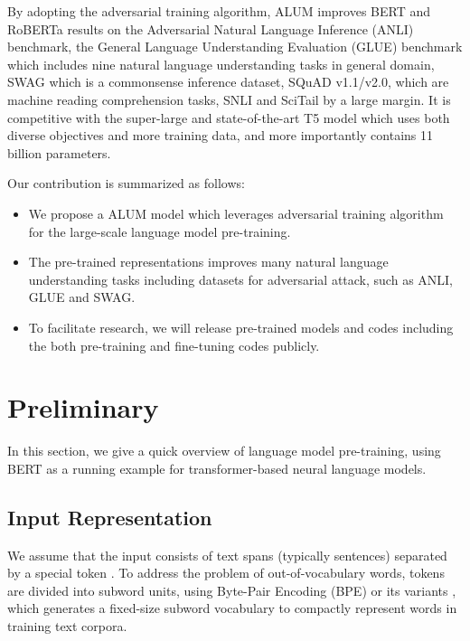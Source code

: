 \documentclass[11pt,a4paper]{article}
\newcommand\DNAME{ALUM}
\begin{document}
{By adopting the adversarial training algorithm, {\DNAME} improves BERT \cite{devlin2018bert} and RoBERTa \cite{liu2019roberta} results on the Adversarial Natural Language Inference (ANLI) benchmark, the General Language Understanding Evaluation (GLUE) benchmark which includes nine natural language understanding tasks in general domain, SWAG which is a commonsense inference dataset, SQuAD v1.1/v2.0, which are machine reading comprehension tasks, SNLI and SciTail by a large margin. It is competitive with the super-large and state-of-the-art T5 model \cite{raffel2019t5} which uses both diverse objectives and more training data, and more importantly contains 11 billion parameters.

Our contribution is summarized as follows:
\begin{itemize}
    \item We propose a {\DNAME} model which leverages adversarial training algorithm for the large-scale language model pre-training.\vspace{-3mm}
    \item The pre-trained representations improves many natural language understanding tasks including datasets for adversarial attack, such as ANLI, GLUE and SWAG.\vspace{-3mm}
    \item To facilitate research, we will release pre-trained models and codes including the both pre-training and fine-tuning codes publicly. \vspace{-3mm}
\end{itemize}
} \section{Preliminary}
\label{sec:prelimiary}
In this section, we give a quick overview of language model pre-training, using BERT \cite{devlin2018bert} as a running example for transformer-based neural language models.

\subsection{Input Representation}
\label{subsec:IR}
We assume that the input consists of text spans (typically sentences) separated by a special token . To address the problem of out-of-vocabulary words, tokens are divided into subword units, using Byte-Pair Encoding (BPE) \cite{sennrich2015bpe} or its variants \cite{kudo2018sentencepiece}, which generates a fixed-size subword vocabulary to compactly represent words in training text corpora.
\end{document}
